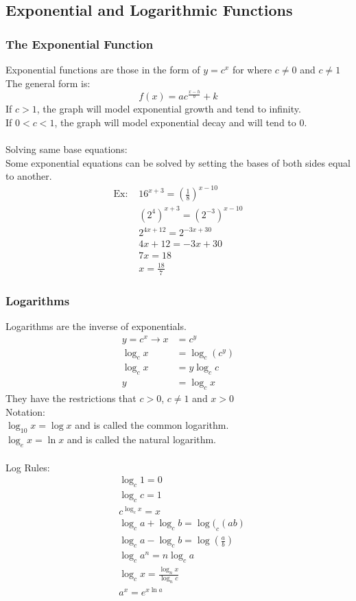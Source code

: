 \subsection{Exponential and Logarithmic Functions}

\subsubsection{The Exponential Function}
Exponential functions are those in the form of $y=c^x$ for where $c\neq0$ and $c\neq 1$\\
The general form is:
$$f(x)=ac^{\frac{x-h}{b}}+k$$
If $c>1$, the graph will model exponential growth and tend to infinity.\\
If $0<c<1$, the graph will model exponential decay and will tend to 0.\\
\\
Solving same base equations:\\
Some exponential equations can be solved by setting the bases of both sides equal to another.\\
\begin{align*}
    \text{Ex: }&16^{x+3}=\left(\frac{1}{8}\right)^{x-10}\\
    &(2^4)^{x+3}=(2^{-3})^{x-10}\\
    &2^{4x+12}=2^{-3x+30}\\
    &4x+12=-3x+30\\
    &7x=18\\
    &x=\frac{18}{7}
\end{align*}

\subsubsection{Logarithms}
Logarithms are the inverse of exponentials.
\begin{align*}
    y=c^x\to x&=c^y\\
    \log_cx&=\log_c(c^y)\\
    \log_cx&=y\log_cc\\
    y&=\log_cx
\end{align*}
They have the restrictions that $c>0$, $c\neq 1$ and $x>0$\\
Notation:\\
$\log_{10}x=\log x$ and is called the common logarithm.\\
$\log_ex=\ln x$ and is called the natural logarithm.\\
\\
Log Rules:
\begin{align*}
    &\log_c1=0\\
    &\log_cc=1\\
    &c^{\log_cx}=x\\
    &\log_ca+\log_cb=\log(_c(ab)\\
    &\log_ca-\log_cb=\log\left(\frac{a}{b}\right)\\
    &\log_ca^n=n\log_ca\\
    &\log_cx=\frac{\log_nx}{\log_nc}\\
    &a^x=e^{x\ln a}
\end{align*}

